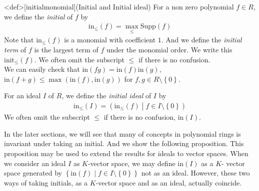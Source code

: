 \documentclass{article}
\renewcommand{\mid}{\middle|}
\begin{document}
\begin{statementsp}<def>[initialmonomial](Initial and Initial ideal)
    For a non zero polynomial $f \in R$, we define the \textit{initial} of $f$ by
    \begin{align}
        \mathrm{in}_{\leq}(f) = \max_{\leq} \mathrm{Supp}(f)
    \end{align}
    Note that $\mathrm{in}_{\leq}(f)$ is a monomial with coefficient $1$. And we define the \textit{initial term} of $f$ is the largest term of $f$ under the monomial order. We write this $\mathrm{init}_{\leq}(f)$. We often omit the subscript $\leq$ if there is no confusion.\\ 
    We can easily check that $\mathrm{in}(fg) = \mathrm{in}(f) \mathrm{in}(g)$, $\mathrm{in}(f+g) \leq \max(\mathrm{in}(f), \mathrm{in}(g))$ for $f,g \in R \setminus \left\{ 0 \right\}$.

    For an ideal $I$ of $R$, we define the \textit{initial ideal} of $I$ by
    \begin{align}
        \mathrm{in}_{\leq}(I) = \left( \mathrm{in}_{\leq}(f) \mid f \in I \setminus \left\{ 0 \right\} \right)
    \end{align}
    We often omit the subscript $\leq$ if there is no confusion, $\mathrm{in}(I)$.
\end{statementsp}

In the later sections, we will see that many of concepts in polynomial rings is invariant under taking an initial. And we show the following proposition. This proposition may be used to extend the results for ideals to vector spaces. When we consider an ideal $I$ as $K$-vector space, we may define $\mathrm{in}(I)$ as a $K$- vector space generated by $\left\{ \mathrm{in}(f) \mid f \in I \setminus \left\{ 0 \right\} \right\}$ not as an ideal. However, these two ways of taking initials, as a $K$-vector space and as an ideal, actually coincide.
\end{document}
